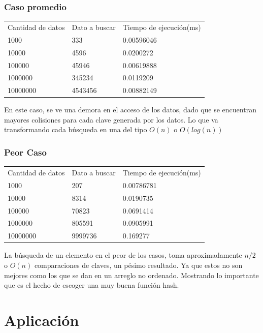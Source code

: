 \documentclass[letterpaper,openright,12pt]{report}
\begin{document}
\subsubsection{Caso promedio}
\begin{center}
\begin{table}[h]
\begin{tabular}{lll}
Cantidad de datos & Dato a buscar & Tiempo de ejecución(ms)\\
1000 & 333     & 0.00596046 \\
10000 & 4596    & 0.0200272  \\
100000 & 45946   & 0.00619888 \\
1000000 & 345234  & 0.0119209  \\
10000000 & 4543456 & 0.00882149
\end{tabular}
\end{table}
\end{center}
En este caso, se ve una demora en el acceso de los datos, dado que se encuentran mayores colisiones para cada clave generada por los datos. Lo que va transformando cada búsqueda en una del tipo $O(n)$ o $O(log(n))$
\newpage

\subsubsection{Peor Caso}
\begin{center}
\begin{table}[h]
\begin{tabular}{lll}
Cantidad de datos & Dato a buscar & Tiempo de ejecución(ms)\\
1000 & 207      & 0.00786781 \\
10000 & 8314    & 0.0190735  \\
100000 & 70823    & 0.0691414 \\
1000000 & 805591  & 0.0905991 \\
10000000 & 9999736  & 0.169277 
\end{tabular}
\end{table}
\end{center}
La búsqueda de un elemento en el peor de los casos, toma aproximadamente $n/2$ o $O(n)$ comparaciones de claves, un pésimo resultado. Ya que estos no son mejores como los que se dan en un arreglo no ordenado. Mostrando lo importante que es el hecho de escoger una muy buena función hash.




\newpage

\section{Aplicación}
\end{document}
